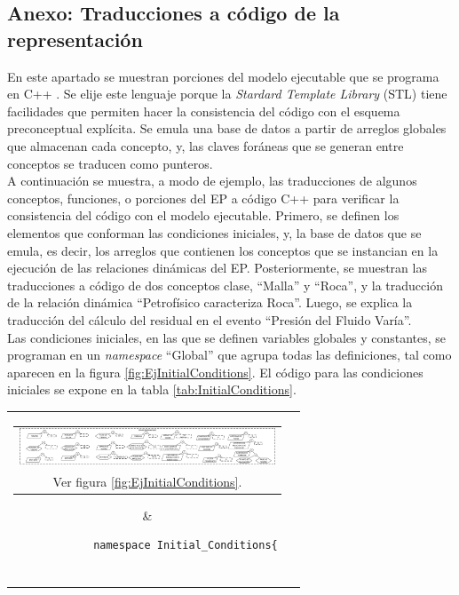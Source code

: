 \begin{appendix}
\chapter{Anexo: Traducciones a código de la representación}
En este apartado se muestran porciones del modelo ejecutable que se programa en C++ \citep{ISO:2017:IIIa}. Se elije este lenguaje porque la \textit{Stardard Template Library} (STL) tiene facilidades que permiten hacer la consistencia del código con el esquema preconceptual explícita. Se emula una base de datos a partir de arreglos globales que almacenan cada concepto, y, las claves foráneas que se generan entre conceptos se traducen como punteros. \\

A continuación se muestra, a modo de ejemplo, las traducciones de algunos conceptos, funciones, o porciones del EP a código C++ para verificar la consistencia del código con el modelo ejecutable. Primero, se definen los elementos que conforman las condiciones iniciales, y, la base de datos que se emula, es decir, los arreglos que contienen los conceptos que se instancian en la ejecución de las relaciones dinámicas del EP. Posteriormente, se muestran las traducciones a código de dos conceptos clase, ``Malla'' y ``Roca'', y la traducción de la relación dinámica ``Petrofísico caracteriza Roca''. Luego, se explica la traducción del cálculo del residual en el evento ``Presión del Fluido Varía''.\\

Las condiciones iniciales, en las que se definen variables globales y constantes, se programan en un \textit{namespace} ``Global'' que agrupa todas las definiciones, tal como aparecen en la figura \ref{fig:EjInitialConditions}. El código para las condiciones iniciales se expone en la tabla \ref{tab:InitialConditions}.\\

\begin{table}[h]
	\centering
	\begin{tabular}{cc}
		\parbox[c]{10em}{
			\begin{tabular}[c]{@{}c@{}}\includegraphics[width=3in]{Fig/EjInitialConditions.pdf}\\ Ver figura \ref{fig:EjInitialConditions}.\end{tabular}
		}
		&
		\begin{tiny}
			\begin{lstlisting}
			namespace Initial_Conditions{
			

\end{lstlisting}
\end{tiny}
\end{tabular}
\end{table}
\end{appendix}
